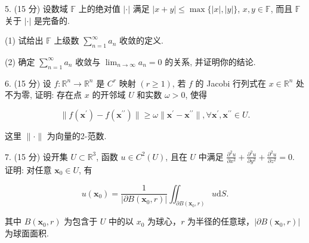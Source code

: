 \documentclass{examcollection}
\renewcommand{\displayformula}[1]{\[#1\]}
\begin{document}
{\begin{minipage}{\textwidth}
5. (15 分) 设数域 $\mathbb{F}$ 上的绝对值 $|\cdot|$ 满足 $|x + y| \leq \max \{|x|, |y|\}$, $x, y \in \mathbb{F}$, 而且 $\mathbb{F}$ 关于 $|\cdot|$ 是完备的.\par
(1) 试给出 $\mathbb{F}$ 上级数 $\sum_{n=1}^{\infty} a_n$ 收敛的定义.\par
(2) 确定 $\sum_{n=1}^{\infty} a_n$ 收敛与 $\lim_{n \to \infty} a_n = 0$ 的关系, 并证明你的结论.\par
6. (15 分) 设 $f: \mathbb{R}^n \to \mathbb{R}^n$ 是 $C^r$ 映射 $(r \geq 1)$, 若 $f$ 的 Jacobi 行列式在 $x \in \mathbb{R}^n$ 处不为零, 证明: 存在点 $x$ 的开邻域 $U$ 和实数 $\omega > 0$, 使得\par
\displayformula{\| f (\boldsymbol {x} ^ {\prime}) - f (\boldsymbol {x} ^ {\prime \prime}) \| \geq \omega \| \boldsymbol {x} ^ {\prime} - \boldsymbol {x} ^ {\prime \prime} \|, \forall \boldsymbol {x} ^ {\prime}, \boldsymbol {x} ^ {\prime \prime} \in U.}\par
这里 $\| \cdot \|$ 为向量的2-范数.\par
7. (15 分) 设开集 $U \subset \mathbb{R}^3$, 函数 $u \in C^2(U)$, 且在 $U$ 中满足 $\frac{\partial^2 u}{\partial x^2} + \frac{\partial^2 u}{\partial y^2} + \frac{\partial^2 u}{\partial z^2} = 0$. 证明: 对任意 $\pmb{x}_0 \in U$, 有\par
\displayformula{u (\boldsymbol {x} _ {0}) = \frac {1}{| \partial B (\boldsymbol {x} _ {0} , r) |} \iint_ {\partial B (\boldsymbol {x} _ {0}, r)} u \mathrm{d} S.}\par
其中 $B(\pmb{x}_0, r)$ 为包含于 $U$ 中的以 $x_0$ 为球心，$r$ 为半径的任意球，$|\partial B(\pmb{x}_0, r)|$ 为球面面积.\par
\end{minipage}}
\ifdim\dimexpr\ht\proofbox+\dp\proofbox\relax>\textheight
\noindent\resizebox{!}{\textheight}{\usebox{\proofbox}}\else\noindent\usebox{\proofbox}\fi\clearpage
\end{document}
